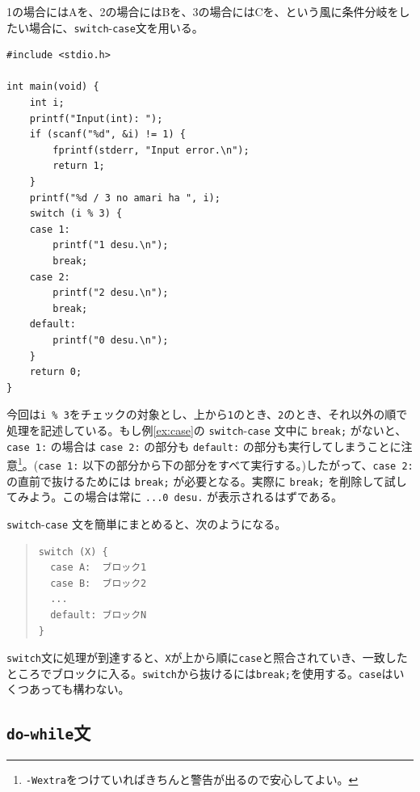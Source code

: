 1の場合にはAを、2の場合にはBを、3の場合にはCを、という風に条件分岐をしたい場合に、\texttt{switch}-\texttt{case}文を用いる。
\begin{reidai}\label{ex:case}
    \begin{verbatim}
#include <stdio.h>

int main(void) {
    int i;
    printf("Input(int): ");
    if (scanf("%d", &i) != 1) {
        fprintf(stderr, "Input error.\n");
        return 1;
    }
    printf("%d / 3 no amari ha ", i);
    switch (i % 3) {
    case 1:
        printf("1 desu.\n");
        break;
    case 2:
        printf("2 desu.\n");
        break;
    default:
        printf("0 desu.\n");
    }
    return 0;
}
\end{verbatim}
\end{reidai} \noindent
今回は\texttt{i \% 3}をチェックの対象とし、上から\texttt{1}のとき、\texttt{2}のとき、それ以外の順で処理を記述している。もし例\ref{ex:case}の \texttt{switch}-\texttt{case} 文中に \texttt{break;} がないと、\texttt{case 1:} の場合は \texttt{case 2:} の部分も \texttt{default:} の部分も実行してしまうことに注意\footnote{\texttt{-Wextra}をつけていればきちんと警告が出るので安心してよい。}。(\texttt{case 1:} 以下の部分から下の部分をすべて実行する。)したがって、\texttt{case 2:} の直前で抜けるためには \texttt{break;} が必要となる。実際に \texttt{break;} を削除して試してみよう。この場合は常に \texttt{...0 desu.} が表示されるはずである。

\texttt{switch}-\texttt{case} 文を簡単にまとめると、次のようになる。
\begin{quote}
    \begin{verbatim}
switch (X) {
  case A:  ブロック1
  case B:  ブロック2
  ...
  default: ブロックN
}
\end{verbatim}
\end{quote}
\texttt{switch}文に処理が到達すると、\texttt{X}が上から順に\texttt{case}と照合されていき、一致したところでブロックに入る。\texttt{switch}から抜けるには\texttt{break;}を使用する。\texttt{case}はいくつあっても構わない。

\subsection{\texttt{do}-\texttt{while}文}

